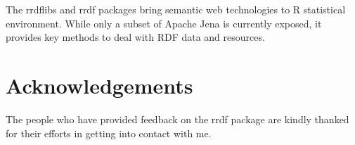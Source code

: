 \documentclass[12pt]{article}
\begin{document}
The rrdflibs and rrdf packages bring semantic web technologies to R statistical environment.
While only a subset of Apache Jena is currently exposed, it provides key methods to deal with
RDF data and resources.

\section{Acknowledgements}

The people who have provided feedback on the rrdf package are kindly thanked for their efforts in
getting into contact with me.

\printbibliography
\end{document}
